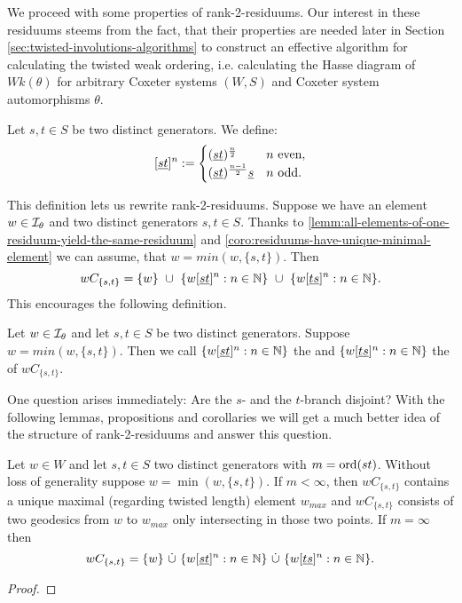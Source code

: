 We proceed with some properties of rank-2-residuums. Our interest in these residuums steems from the fact, that their properties are needed later in Section \ref{sec:twisted-involutions-algorithms} to construct an effective algorithm for calculating the twisted weak ordering, i.e. calculating the Hasse diagram of $Wk(\theta)$ for arbitrary Coxeter systems $(W,S)$ and Coxeter system automorphisms $\theta$.

\begin{defi}
	Let $s,t \in S$ be two distinct generators. We define:
	$$[\underline{s} \underline{t}]^n :=
	\begin{cases}
	(\underline{s} \underline{t})^{\frac{n}{2}} & n \textrm{ even}, \\
	(\underline{s} \underline{t})^{\frac{n-1}{2}} \underline{s} & n \textrm{ odd}. 
	\end{cases}$$
\end{defi}

This definition lets us rewrite rank-2-residuums. Suppose we have an element $w \in \mathcal{I}_{\theta}$ and two distinct generators $s,t \in S$. Thanks to \ref{lemm:all-elements-of-one-residuum-yield-the-same-residuum} and \ref{coro:residuums-have-unique-minimal-element} we can assume, that $w = min(w,\{s,t\})$. Then
$$ wC_{\{s,t\}} = \{ w \} \ \cup \ \{ w [\underline{s} \underline{t}]^n : n \in \mathbb{N} \} \ \cup \ \{ w [\underline{t} \underline{s}]^n : n \in \mathbb{N} \}. $$
This encourages the following definition.

\begin{defi}
	Let $w \in \mathcal{I}_{\theta}$ and let $s,t \in S$ be two distinct generators. Suppose $w = min(w,\{s,t\})$. Then we call $\{ w [\underline{s} \underline{t}]^n : n \in \mathbb{N} \}$ the  and $\{ w [\underline{t} \underline{s}]^n : n \in \mathbb{N} \}$ the  of $wC_{\{s,t\}}$.
\end{defi}

One question arises immediately: Are the $s$- and the $t$-branch disjoint? With the following lemmas, propositions and corollaries we will get a much better idea of the structure of rank-2-residuums and answer this question.

\begin{lemm}
	Let $w \in W$ and let $s,t \in S$ two distinct generators with $m = \operatorname{ord}(st)$. Without loss of generality suppose $w = \min(w, \{s,t\})$. If $m < \infty$, then $wC_{\{s,t\}}$ contains a unique maximal (regarding twisted length) element $w_{max}$ and $wC_{\{s,t\}}$ consists of two geodesics from $w$ to $w_{max}$ only intersecting in those two points. If $m = \infty$ then
	$$ wC_{\{s,t\}} = \{ w \} \ \dot \cup \ \{ w [\ul s \ul t]^n : n \in \nn \} \ \dot \cup \ \{ w [\ul t \ul s]^n : n \in \nn \}. $$

	\begin{proof}
		\todo
	\end{proof}
\end{lemm}

